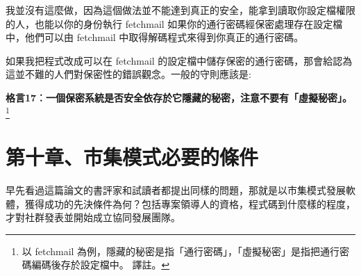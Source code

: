 \documentclass[12pt,]{article}
\makeatletter
\newcommand*{\shifttext}[2]{%
  \settowidth{\@tempdima}{#2}%
  \makebox[\@tempdima]{\hspace*{#1}#2}%
}
\makeatother
\begin{document}
我並沒有這麼做，因為這個做法並不能達到真正的安全，能拿到讀取你設定檔權限的人，也能以你的身份執行
fetchmail \shifttext{1pt}{---}\shifttext{-1pt}{---} 如果你的通行密碼經保密處理存在設定檔中，他們可以由
fetchmail 中取得解碼程式來得到你真正的通行密碼。

如果我把程式改成可以在 fetchmail
的設定檔中儲存保密的通行密碼，那會給認為這並不難的人們對保密性的錯誤觀念。一般的守則應該是:

\textbf{格言17︰一個保密系統是否安全依存於它隱藏的秘密，注意不要有「虛擬秘密」。}\footnote{以
  fetchmail
  為例，隱藏的秘密是指「通行密碼」，「虛擬秘密」是指把通行密碼編碼後存於設定檔中。
  \shifttext{1pt}{---}\shifttext{-1pt}{---} 譯註。}

\newpage
\section{第十章、市集模式必要的條件}

早先看過這篇論文的書評家和試讀者都提出同樣的問題，那就是以市集模式發展軟體，獲得成功的先決條件為何？包括專案領導人的資格，程式碼到什麼樣的程度，才對社群發表並開始成立協同發展團隊。
\end{document}
